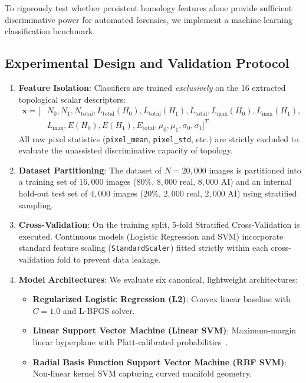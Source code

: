 \documentclass[11pt,a4paper]{article}
\begin{document}
To rigorously test whether persistent homology features alone provide sufficient discriminative power for automated forensics, we implement a machine learning classification benchmark.

\subsection{Experimental Design and Validation Protocol}
\begin{enumerate}
    \item \textbf{Feature Isolation}: Classifiers are trained \textit{exclusively} on the 16 extracted topological scalar descriptors:
    \begin{equation}
    \begin{split}
        \mathbf{x} = \big[ & N_0, N_1, N_{\text{total}}, L_{\text{total}}(H_0), L_{\text{total}}(H_1), L_{\text{total}}, L_{\max}(H_0), L_{\max}(H_1), \\
        & L_{\max}, E(H_0), E(H_1), E_{\text{total}}, \mu_0, \mu_1, \sigma_0, \sigma_1 \big]^T
    \end{split}
    \end{equation}
    All raw pixel statistics (\texttt{pixel\_mean}, \texttt{pixel\_std}, etc.) are strictly excluded to evaluate the unassisted discriminative capacity of topology.
    \item \textbf{Dataset Partitioning}: The dataset of $N=20{,}000$ images is partitioned into a training set of $16{,}000$ images (80\%, $8{,}000$ real, $8{,}000$ AI) and an internal hold-out test set of $4{,}000$ images (20\%, $2{,}000$ real, $2{,}000$ AI) using stratified sampling.
    \item \textbf{Cross-Validation}: On the training split, 5-fold Stratified Cross-Validation is executed. Continuous models (Logistic Regression and SVM) incorporate standard feature scaling (\texttt{StandardScaler}) fitted strictly within each cross-validation fold to prevent data leakage.
    \item \textbf{Model Architectures}: We evaluate six canonical, lightweight architectures:
    \begin{itemize}[noitemsep]
        \item \textbf{Regularized Logistic Regression (L2)}: Convex linear baseline with $C=1.0$ and L-BFGS solver.
        \item \textbf{Linear Support Vector Machine (Linear SVM)}: Maximum-margin linear hyperplane with Platt-calibrated probabilities~\cite{cortes1995support}.
        \item \textbf{Radial Basis Function Support Vector Machine (RBF SVM)}: Non-linear kernel SVM capturing curved manifold geometry.

\end{itemize}
\end{enumerate}
\end{document}
